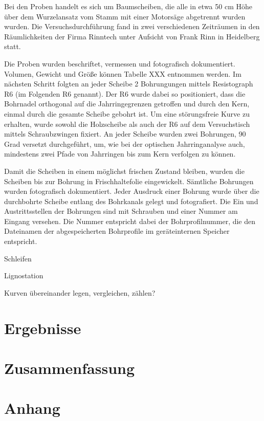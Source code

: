 \documentclass[a4paper, halfparskip]{article}
\def\SymbReg{\textsuperscript{\textregistered}}
\begin{document}
Bei den Proben handelt es sich um Baumscheiben, die alle in etwa 50 cm Höhe
über dem Wurzelansatz vom Stamm mit einer Motorsäge abgetrennt wurden wurden.
Die Versuchsdurchführung fand in zwei verschiedenen Zeiträumen in den
Räumlichkeiten der Firma Rinntech unter Aufsicht von Frank Rinn in Heidelberg
statt. 

Die Proben wurden beschriftet, vermessen und fotografisch dokumentiert.
Volumen, Gewicht und Größe können Tabelle XXX entnommen werden.  Im nächsten
Schritt folgten an jeder Scheibe 2 Bohrungungen mittels Resistograph\SymbReg
R6 (im Folgenden R6 genannt). Der R6 wurde dabei so positioniert, dass die
Bohrnadel orthogonal auf die Jahrringegrenzen getroffen und durch den Kern,
einmal durch die gesamte Scheibe gebohrt ist. Um eine störungsfreie Kurve zu
erhalten, wurde sowohl die Holzscheibe als auch der R6 auf dem Versuchstisch
mittels Schraubzwingen fixiert. An jeder Scheibe wurden zwei Bohrungen, 90
Grad versetzt durchgeführt, um, wie bei der optischen Jahrringanalyse auch,
mindestens zwei Pfade von Jahrringen bis zum Kern verfolgen zu können. 

Damit die Scheiben in einem möglichst frischen Zustand bleiben, wurden die
Scheiben bis zur Bohrung in Frischhaltefolie eingewickelt. Sämtliche
Bohrungen wurden fotografisch dokumentiert. Jeder Ausdruck einer Bohrung wurde
über die durchbohrte Scheibe entlang des Bohrkanals gelegt und fotografiert.
Die Ein und Austrittsstellen der Bohrungen sind mit Schrauben und einer Nummer
am Eingang versehen. Die Nummer entspricht dabei der Bohrprofilnummer, die den
Dateinamen der abgespeicherten Bohrprofile im geräteinternen Speicher
entspricht.

Schleifen

Lignostation

Kurven übereinander legen, vergleichen, zählen?

\section{Ergebnisse}
\section{Zusammenfassung}
\section{Anhang}



\end{document}

